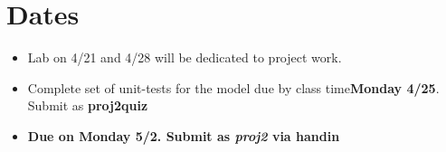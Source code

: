 \documentclass[]{tufte-handout}
\begin{document}
\section{Dates}

\begin{itemize}
\item Lab on 4/21 and 4/28 will be dedicated to project work.
\item Complete set of unit-tests for the model due by class time\textbf{Monday 4/25}. Submit as \textbf{proj2quiz}
\item \textbf{Due on Monday 5/2. Submit as \textit{proj2} via handin}
\end{itemize}
\end{document}
